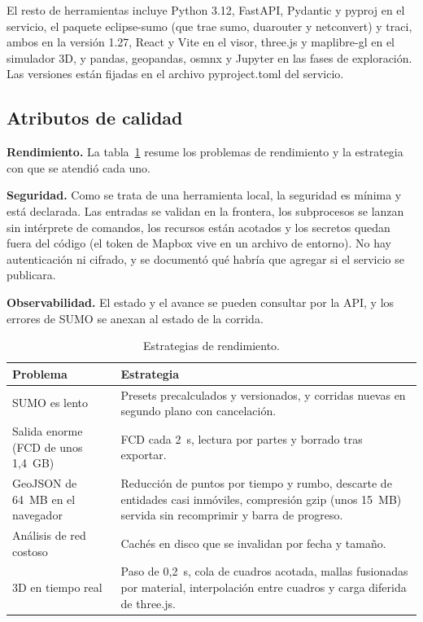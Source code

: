 El resto de herramientas incluye Python 3.12, FastAPI, Pydantic y pyproj en el servicio, el paquete eclipse-sumo (que trae sumo, duarouter y netconvert) y traci, ambos en la versión 1.27, React y Vite en el visor, three.js y maplibre-gl en el simulador 3D, y pandas, geopandas, osmnx y Jupyter en las fases de exploración. Las versiones están fijadas en el archivo pyproject.toml del servicio.

\subsection{Atributos de calidad}

\textbf{Rendimiento.} La tabla~\ref{tab:rendimiento} resume los problemas de rendimiento y la estrategia con que se atendió cada uno.

\textbf{Seguridad.} Como se trata de una herramienta local, la seguridad es mínima y está declarada. Las entradas se validan en la frontera, los subprocesos se lanzan sin intérprete de comandos, los recursos están acotados y los secretos quedan fuera del código (el token de Mapbox vive en un archivo de entorno). No hay autenticación ni cifrado, y se documentó qué habría que agregar si el servicio se publicara.

\textbf{Observabilidad.} El estado y el avance se pueden consultar por la API, y los errores de SUMO se anexan al estado de la corrida.

\begin{table}[ht]
\renewcommand{\arraystretch}{1.15}
\centering
\small
\begin{tabular}{|p{4.2cm}|p{9.8cm}|}
\hline
\textbf{Problema} & \textbf{Estrategia} \\ \hline
SUMO es lento & Presets precalculados y versionados, y corridas nuevas en segundo plano con cancelación. \\ \hline
Salida enorme (FCD de unos 1,4~GB) & FCD cada 2~s, lectura por partes y borrado tras exportar. \\ \hline
GeoJSON de 64~MB en el navegador & Reducción de puntos por tiempo y rumbo, descarte de entidades casi inmóviles, compresión gzip (unos 15~MB) servida sin recomprimir y barra de progreso. \\ \hline
Análisis de red costoso & Cachés en disco que se invalidan por fecha y tamaño. \\ \hline
3D en tiempo real & Paso de 0,2~s, cola de cuadros acotada, mallas fusionadas por material, interpolación entre cuadros y carga diferida de three.js. \\ \hline
\end{tabular}
\caption{Estrategias de rendimiento.}
\label{tab:rendimiento}
\end{table}
